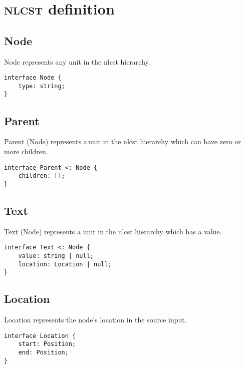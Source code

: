 
\chapter{\textsc{nlcst} definition}\label{appendix-nlcst}

\section*{Node}\label{node}

Node represents any unit in the \gls{nlcst} hierarchy.

\begin{lstlisting}
interface Node {
    type: string;
}
\end{lstlisting}

\section*{Parent}\label{parent}

Parent (Node) represents a\,unit in the \gls{nlcst} hierarchy which can have
  zero or more children.

\begin{lstlisting}
interface Parent <: Node {
    children: [];
}
\end{lstlisting}

\section*{Text}\label{text}

Text (Node) represents a unit in the \gls{nlcst} hierarchy which has a
  value.

\begin{lstlisting}
interface Text <: Node {
    value: string | null;
    location: Location | null;
}
\end{lstlisting}

\section*{Location}\label{location}

Location represents the node's location in the source input.

\begin{lstlisting}
interface Location {
    start: Position;
    end: Position;
}
\end{lstlisting}

